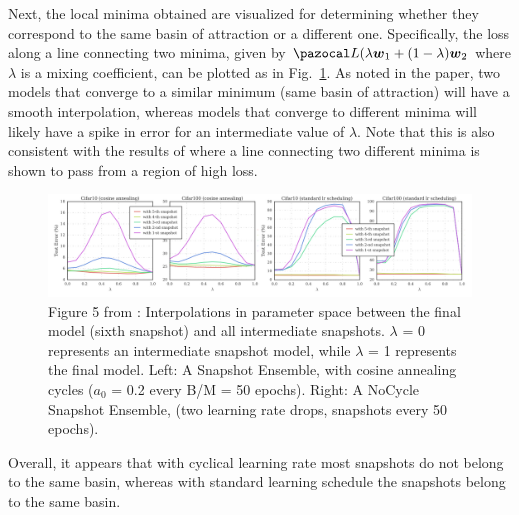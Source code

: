 Next, the local minima obtained are visualized for determining whether they correspond to the same basin of attraction or a different one.
Specifically, the loss along a line connecting two minima, given by $\cL(\lambda \bw_1 + (1-\lambda) \bw_2$ where $\lambda$ is a mixing coefficient, can be plotted as in Fig.~\ref{huangminima}.
As noted in the paper, two models that converge to a similar minimum (same basin of attraction) will have a smooth interpolation, whereas models that converge to different minima will likely have a spike in error for an intermediate value of $\lambda$. 
Note that this is also consistent with the results of \textcite{fort2020deep} where a line connecting two different minima is shown to pass from a region of high loss.
\begin{figure}[H]
	\centering
	\includegraphics[width=1\linewidth]{./Figures/huangminima.png}
	\caption{Figure 5 from \textcite{huang2017snapshot}: Interpolations in parameter space between the final model (sixth snapshot) and all intermediate
		snapshots. $\lambda$ = 0 represents an intermediate snapshot model, while $\lambda$ = 1 represents the final model. Left: A
		Snapshot Ensemble, with cosine annealing cycles ($a_0$ = 0.2 every B/M = 50 epochs). Right: A NoCycle
		Snapshot Ensemble, (two learning rate drops, snapshots every 50 epochs).
}
	\label{huangminima}
\end{figure}
Overall, it appears that with cyclical learning rate most snapshots do not belong to the same basin, whereas with standard learning schedule the snapshots belong to the same basin.

